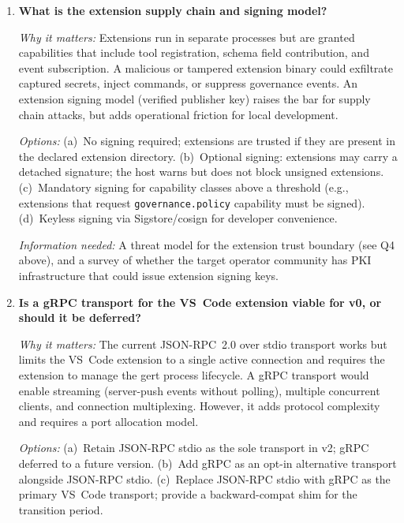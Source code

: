 \begin{enumerate}[label=\textbf{Q\arabic*.}]
    \textit{Information needed:} A complete method inventory of the v1 JSON-RPC API surface (all
    methods and notification shapes currently used by the VS~Code extension), and a determination of
    which methods require changes to expose v2-specific features (e.g., saga events, OTel trace IDs).

  \item \textbf{What is the extension supply chain and signing model?}

    \textit{Why it matters:} Extensions run in separate processes but are granted capabilities that
    include tool registration, schema field contribution, and event subscription. A malicious or
    tampered extension binary could exfiltrate captured secrets, inject commands, or suppress
    governance events. An extension signing model (verified publisher key) raises the bar for supply
    chain attacks, but adds operational friction for local development.

    \textit{Options:} (a)~No signing required; extensions are trusted if they are present in the
    declared extension directory. (b)~Optional signing: extensions may carry a detached signature;
    the host warns but does not block unsigned extensions. (c)~Mandatory signing for capability
    classes above a threshold (e.g., extensions that request \texttt{governance.policy} capability
    must be signed). (d)~Keyless signing via Sigstore/cosign for developer convenience.

    \textit{Information needed:} A threat model for the extension trust boundary (see Q4 above), and
    a survey of whether the target operator community has PKI infrastructure that could issue extension
    signing keys.

  \item \textbf{Is a gRPC transport for the VS~Code extension viable for v0, or should it be deferred?}

    \textit{Why it matters:} The current JSON-RPC~2.0 over stdio transport works but limits the
    VS~Code extension to a single active connection and requires the extension to manage the gert
    process lifecycle. A gRPC transport would enable streaming (server-push events without polling),
    multiple concurrent clients, and connection multiplexing. However, it adds protocol complexity
    and requires a port allocation model.

    \textit{Options:} (a)~Retain JSON-RPC stdio as the sole transport in v2; gRPC deferred to a
    future version. (b)~Add gRPC as an opt-in alternative transport alongside JSON-RPC stdio.
    (c)~Replace JSON-RPC stdio with gRPC as the primary VS~Code transport; provide a backward-compat
    shim for the transition period.


\end{enumerate}
